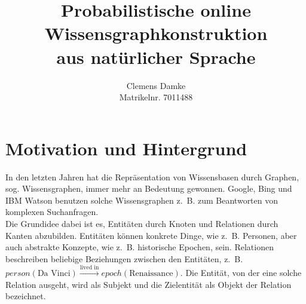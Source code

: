 \documentclass[11pt, a4paper]{scrreprt}
\begin{document}
\titlehead{Entwurf 5}
\subject{Bachelorarbeit Proposal}
\title{
	Probabilistische online\\
	Wissensgraphkonstruktion\\
	aus natürlicher Sprache
}
\author{
	Clemens Damke\\[1ex]
	Matrikelnr. 7011488
}
\publishers{
	{\normalsize betreut von}\\[2ex]
	Prof.~Dr.~Eyke Hüllermeier\\
	Intelligente Systeme\\
	Institut für Informatik\\
	Universität Paderborn
}
\maketitle

\section{Motivation und Hintergrund}

In den letzten Jahren hat die Repräsentation von Wissensbasen durch Graphen, sog. Wissensgraphen, immer mehr an Bedeutung gewonnen.
Google, Bing und IBM Watson benutzen solche Wissensgraphen z.~B. zum Beantworten von komplexen Suchanfragen.\\

Die Grundidee dabei ist es, Entitäten durch Knoten und Relationen durch Kanten abzubilden.
Entitäten können konkrete Dinge, wie z.~B. Personen, aber auch abstrakte Konzepte, wie z.~B. historische Epochen, sein.
Relationen beschreiben beliebige Beziehungen zwischen den Entitäten, z.~B. \(person(\text{Da~Vinci}) \xrightarrow{\text{lived~in}} epoch(\text{Renaissance})\).
Die Entität, von der eine solche Relation ausgeht, wird als Subjekt und die Zielentität als Objekt der Relation bezeichnet.\\
\end{document}
